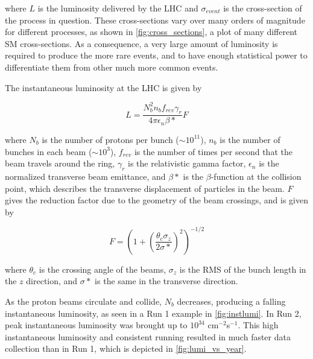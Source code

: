 where $L$ is the luminosity delivered by the \ac{LHC} and $\sigma_{event}$ is the cross-section of the process in question. These cross-sections vary over many orders of magnitude for different processes, as shown in \autoref{fig:cross_sections}, a plot of many different \ac{SM} cross-sections. As a consequence, a very large amount of luminosity is required to produce the more rare events, and to have enough statistical power to differentiate them from other much more common events.   

The instantaneous luminosity at the \ac{LHC} is given by

\begin{equation}
L = \frac{ N^2_b n_b f_{rev} \gamma_r }{ 4\pi \epsilon_n \beta* } F
\end{equation}

where $N_b$ is the number of protons per bunch ($\sim10^{11}$), $n_b$ is the number of bunches in each beam ($\sim10^3$), $f_{rev}$ is the number of times per second that the beam travels around the ring, $\gamma_r$ is the relativistic gamma factor, $\epsilon_n$ is the normalized transverse beam emittance, and $\beta*$ is the $\beta$-function at the collision point, which describes the transverse displacement of particles in the beam. $F$ gives the reduction factor due to the geometry of the beam crossings, and is given by

\begin{equation}
F = (1+ (\frac{\theta_c \sigma_z}{2\sigma*})^2)^{-1/2}
\end{equation}

where $\theta_c$ is the crossing angle of the beams, $\sigma_z$ is the RMS of the bunch length in the $z$ direction, and $\sigma*$ is the same in the transverse direction.

As the proton beams circulate and collide, $N_b$ decreases, producing a falling instantaneous luminosity, as seen in a Run 1 example in \autoref{fig:instlumi}. In Run 2, peak instantaneous luminosity was brought up to $10^{34}$ cm$^{-2}$s$^{-1}$. This high instantaneous luminosity and consistent running resulted in much faster data collection than in Run 1, which is depicted in \autoref{fig:lumi_vs_year}. 

